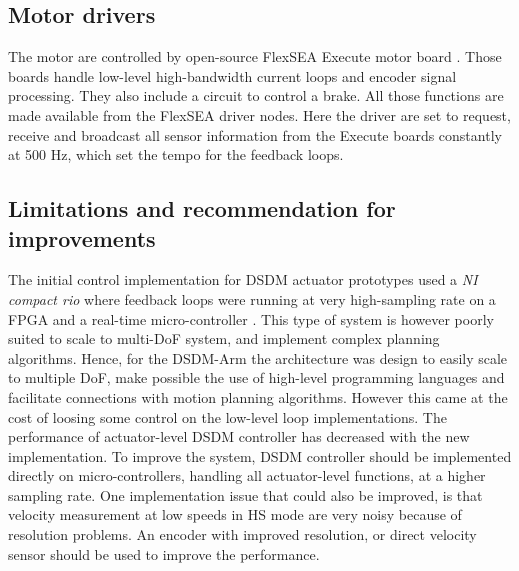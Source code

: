 \subsection{Motor drivers}

The motor are controlled by open-source FlexSEA Execute motor board \cite{duval_flexsea-execute:_2016}. Those boards handle low-level high-bandwidth current loops and encoder signal processing. They also include a circuit to control a brake. All those functions are made available from the FlexSEA driver nodes. Here the driver are set to request, receive and broadcast all sensor information from the Execute boards constantly at 500 Hz, which set the tempo for the feedback loops. 


\subsection{Limitations and recommendation for improvements} 

The initial control implementation for DSDM actuator prototypes used a \textit{NI compact rio} where feedback loops were running at very high-sampling rate on a FPGA and a real-time micro-controller \cite{girard_two-speed_2015}. This type of system is however poorly suited to scale to multi-DoF system, and implement complex planning algorithms. Hence, for the DSDM-Arm the architecture was design to easily scale to multiple DoF, make possible the use of high-level programming languages and facilitate connections with motion planning algorithms. However this came at the cost of loosing some control on the low-level loop implementations. The performance of actuator-level DSDM controller has decreased with the new implementation. To improve the system, DSDM controller should be implemented directly on micro-controllers, handling all actuator-level functions, at a higher sampling rate. One implementation issue that could also be improved, is that velocity measurement at low speeds in HS mode are very noisy because of resolution problems. An encoder with improved resolution, or direct velocity sensor should be used to improve the performance. 








